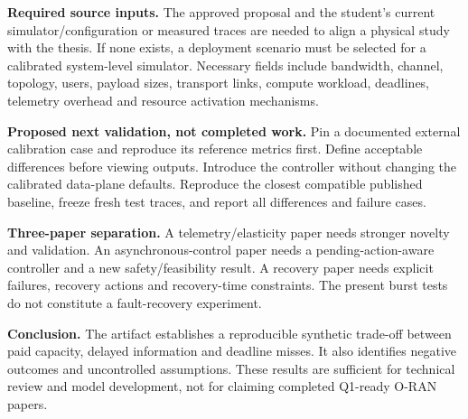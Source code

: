 \documentclass[10pt,a4paper]{article}
\begin{document}
\textbf{Required source inputs.} The approved proposal and the student's current
simulator/configuration or measured traces are needed to align a physical study
with the thesis. If none exists, a deployment scenario must be selected for a
calibrated system-level simulator. Necessary fields include bandwidth, channel,
topology, users, payload sizes, transport links, compute workload, deadlines,
telemetry overhead and resource activation mechanisms.

\textbf{Proposed next validation, not completed work.} Pin a documented external
calibration case and reproduce its reference metrics first. Define acceptable
differences before viewing outputs. Introduce the controller without changing
the calibrated data-plane defaults. Reproduce the closest compatible published
baseline, freeze fresh test traces, and report all differences and failure cases.

\textbf{Three-paper separation.} A telemetry/elasticity paper needs stronger
novelty and validation. An asynchronous-control paper needs a pending-action-aware
controller and a new safety/feasibility result. A recovery paper needs explicit
failures, recovery actions and recovery-time constraints. The present burst tests
do not constitute a fault-recovery experiment.

\textbf{Conclusion.} The artifact establishes a reproducible synthetic trade-off
between paid capacity, delayed information and deadline misses. It also identifies
negative outcomes and uncontrolled assumptions. These results are sufficient for
technical review and model development, not for claiming completed Q1-ready O-RAN papers.
\end{document}
